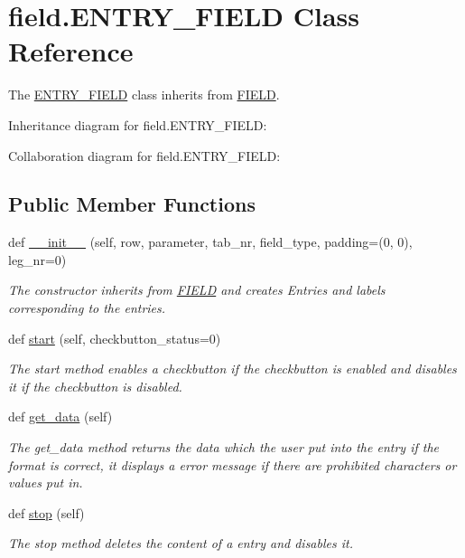 \hypertarget{classfield_1_1ENTRY__FIELD}{}\section{field.\+E\+N\+T\+R\+Y\+\_\+\+F\+I\+E\+LD Class Reference}
\label{classfield_1_1ENTRY__FIELD}


The \hyperlink{classfield_1_1ENTRY__FIELD}{E\+N\+T\+R\+Y\+\_\+\+F\+I\+E\+LD} class inherits from \hyperlink{classfield_1_1FIELD}{F\+I\+E\+LD}.  




Inheritance diagram for field.\+E\+N\+T\+R\+Y\+\_\+\+F\+I\+E\+LD\+:


Collaboration diagram for field.\+E\+N\+T\+R\+Y\+\_\+\+F\+I\+E\+LD\+:
\subsection*{Public Member Functions}
\begin{DoxyCompactItemize}
\item 
def \hyperlink{classfield_1_1ENTRY__FIELD_a9b1f1028d872599a49fc24758320fc96}{\+\_\+\+\_\+init\+\_\+\+\_\+} (self, row, parameter, tab\+\_\+nr, field\+\_\+type, padding=(0, 0), leg\+\_\+nr=0)
\begin{DoxyCompactList}\small\item\em The constructor inherits from \hyperlink{classfield_1_1FIELD}{F\+I\+E\+LD} and creates Entries and labels corresponding to the entries. \end{DoxyCompactList}\item 
def \hyperlink{classfield_1_1ENTRY__FIELD_ae2e9fcabf60c2a2865bff3de226e97a3}{start} (self, checkbutton\+\_\+status=0)
\begin{DoxyCompactList}\small\item\em The start method enables a checkbutton if the checkbutton is enabled and disables it if the checkbutton is disabled. \end{DoxyCompactList}\item 
def \hyperlink{classfield_1_1ENTRY__FIELD_a507d037b7c07b2da5c7d344e20d32fac}{get\+\_\+data} (self)
\begin{DoxyCompactList}\small\item\em The get\+\_\+data method returns the data which the user put into the entry if the format is correct, it displays a error message if there are prohibited characters or values put in. \end{DoxyCompactList}\item 
def \hyperlink{classfield_1_1ENTRY__FIELD_ad87b69becbcd6dd90bd3854e53a72195}{stop} (self)
\begin{DoxyCompactList}\small\item\em The stop method deletes the content of a entry and disables it. \end{DoxyCompactList}\end{DoxyCompactItemize}
